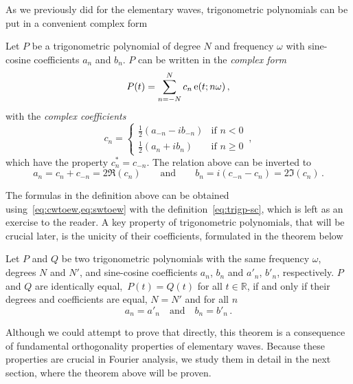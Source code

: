 As we previously did for the elementary waves, trigonometric polynomials can be put in a
convenient complex form
\begin{definition}
  \label{def:trigp-complex}
  Let $P$ be a trigonometric polynomial of degree $N$ and frequency $\omega$ with
  sine-cosine coefficients $a_n$ and $b_n$. $P$ can be written in the \emph{complex form}
  \begin{equation}
    P(t)=\sum_{n=-N}^{N}c_n\operatorname{e}(t;n\omega)\,,\label{eq:trigp-complex}
  \end{equation}
  with the \emph{complex coefficients}
  \begin{equation}
    c_n =
    \begin{cases}
      \frac{1}{2}(a_{-n}-ib_{-n})&\text{if~}n< 0\\
      \frac{1}{2}(a_n+ib_n)&\text{if~}n\geq 0
    \end{cases}
    \,,\label{eq:ab-to-c}
  \end{equation}
  which have the property $c_n^*=c_{-n}$. The relation above can be inverted to
  \begin{equation}
    a_n=c_n+c_{-n}=2\Re(c_n)\qquad\text{and}\qquad
    b_n=i(c_{-n}-c_{n})=2\Im(c_n)\,.
  \end{equation}
\end{definition}
The formulas in the definition above can be obtained using~\cref{eq:cwtoew,eq:swtoew} with
the definition~\cref{eq:trigp-sc}, which is left as an exercise to the reader. A key
property of trigonometric polynomials, that will be crucial later, is the unicity of their
coefficients, formulated in the theorem below
\begin{theorem}
  \label{thm:trigp-unicity}
  Let $P$ and $Q$ be two trigonometric polynomials with the same frequency $\omega$,
  degrees $N$ and $N'$, and sine-cosine coefficients $a_n$, $b_n$ and $a'_n$, $b'_n$,
  respectively. $P$ and $Q$ are identically equal,~\ie $P(t)=Q(t)$ for all
  $t\in\mathbb{R}$, if and only if their degrees and coefficients are equal, \ie $N=N'$
  and for all $n$
  \begin{equation}
    a_n=a'_n\quad\text{and}\quad b_n=b'_n\,.
  \end{equation}
\end{theorem}
Although we could attempt to prove that directly, this theorem is a consequence of
fundamental orthogonality properties of elementary waves. Because these properties are
crucial in Fourier analysis, we  study them in detail in the next section, where the
theorem above will be proven.

